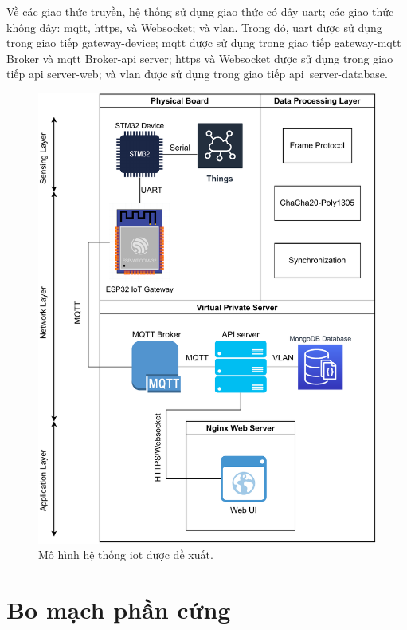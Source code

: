 Về các giao thức truyền, hệ thống sử dụng giao thức có dây \acrfull{uart}; các giao thức không dây: \acrshort{mqtt}, \acrfull{https}, và Websocket; và \acrshort{vlan}. Trong đó, \acrshort{uart} được sử dụng trong giao tiếp gateway-device; \acrshort{mqtt} được sử dụng trong giao tiếp gateway-\acrshort{mqtt} Broker và \acrshort{mqtt} Broker-\acrshort{api} server; \acrshort{https} và Websocket được sử dụng trong giao tiếp \acrshort{api} server-web; và \acrshort{vlan} được sử dụng trong giao tiếp \acrshort{api}~server-database.

\begin{figure}[htp]
\centering
\includegraphics[width=1.0\linewidth]{images/Thesis-Page-8-IoT-Model-Overral.pdf}
\caption{Mô hình hệ thống \acrshort{iot} được đề xuất.}
\label{fig:IoT-Model-Overral}
\end{figure}

\section{Bo mạch phần cứng}

